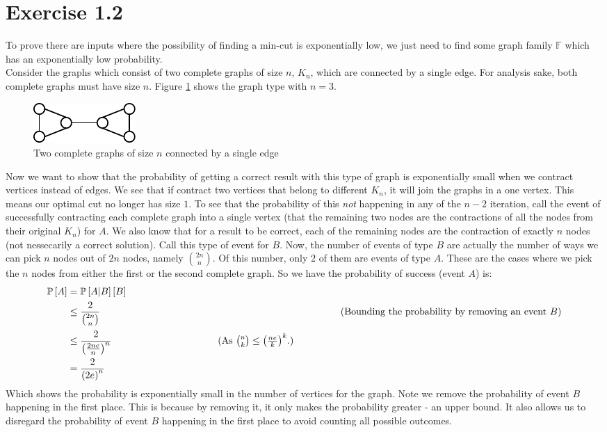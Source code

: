 \documentclass[a4paper]{article}
\newcommand{\comment}[1]{%
  \text{\phantom{(#1)}} \tag{#1}}
\begin{document}
\section*{Exercise 1.2}
To prove there are inputs where the possibility of finding a min-cut is exponentially low, we just need to find some graph family $\mathbb{F}$ which has an exponentially low probability. \\
Consider the graphs which consist of two complete graphs of size $n$, $K_n$, which are connected by a single edge. For analysis sake, both complete graphs must have size $n$. Figure \ref{fig1} shows the graph type with $n=3$.
\begin{figure}[H]
  \centering
  \includegraphics[scale=2]{fig1.pdf}
  \caption{Two complete graphs of size $n$ connected by a single edge}
  \label{fig1}
\end{figure}
Now we want to show that the probability of getting a correct result with this type of graph is exponentially small when we contract vertices instead of edges. We see that if contract two vertices that belong to different $K_n$, it will join the graphs in a one vertex. This means our optimal cut no longer has size $1$. To see that the probability of this \textit{not} happening in any of the $n-2$ iteration, call the event of successfully contracting each complete graph into a single vertex (that the remaining two nodes are the contractions of all the nodes from their original $K_n$) for $A$. We also know that for a result to be correct, each of the remaining nodes are the contraction of exactly $n$ nodes (not nessecarily a correct solution). Call this type of event for $B$. Now, the number of events of type $B$ are actually the number of ways we can pick $n$ nodes out of $2n$ nodes, namely $\binom{2n}{n}$. Of this number, only $2$ of them are events of type $A$. These are the cases where we pick the $n$ nodes from either the first or the second complete graph. So we have the probability of success (event $A$) is:
\begin{align*}
  \mathbb{P}\left[ A \right] &= \mathbb{P}\left[A|B\right]\left[B\right] \\
                             &\leq \frac{2}{\binom{2n}{n}} \comment{Bounding the probability by removing an event $B$} \\
                             &\leq\frac{2}{\left(\frac{2ne}{n}\right)^n} \comment{As $\binom{n}{k}\leq \left(\frac{ne}{k}\right)^k$.} \\
                             &=\frac{2}{\left(2e\right)^n}
\end{align*}
Which shows the probability is exponentially small in the number of vertices for the graph. Note we remove the probability of event $B$ happening in the first place. This is because by removing it, it only makes the probability greater - an upper bound. It also allows us to disregard the probability of event $B$ happening in the first place to avoid counting all possible outcomes.
\end{document}
